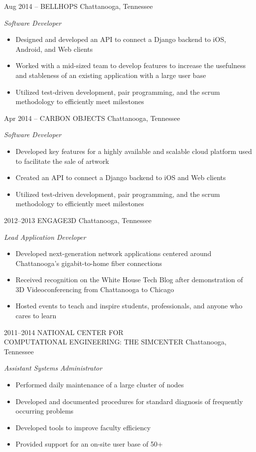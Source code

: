 \documentclass[]{friggeri-cv} %
\begin{document}
\begin{entrylist}
\entry
{Aug 2014 --}
{BELLHOPS}
{Chattanooga, Tennessee}
{\emph{Software Developer} \\ 
\begin{itemize}
\item Designed and developed an API to connect a Django backend to iOS, Android, and Web clients
\item Worked with a mid-sized team to develop features to increase the usefulness and stableness of an existing application with a large user base
\item Utilized test-driven development, pair programming, and the scrum methodology to efficiently meet milestones
\end{itemize}}
\entry
{Apr 2014 --}
{CARBON OBJECTS}
{Chattanooga, Tennessee}
{\emph{Software Developer} \\ 
\begin{itemize}
\item Developed key features for a highly available and scalable cloud platform used to facilitate the sale of artwork
\item Created an API to connect a Django backend to iOS and Web clients
\item Utilized test-driven development, pair programming, and the scrum methodology to efficiently meet milestones
\end{itemize}}

\entry
{2012--2013}
{ENGAGE3D}
{Chattanooga, Tennessee}
{\emph{ Lead Application Developer}\\
\begin{itemize}
\item Developed next-generation network applications centered around Chattanooga's gigabit-to-home fiber connections
\item Received recognition on the White House Tech Blog after demonstration of 3D Videoconferencing from Chattanooga to Chicago
\item Hosted events to teach and inspire students, professionals, and anyone who cares to learn
\end{itemize}}
\entry
{2011--2014}
{NATIONAL CENTER FOR \\
COMPUTATIONAL ENGINEERING: THE SIMCENTER}
{Chattanooga, Tennessee}
{\emph{ Assistant Systems Administrator} \\ 
\begin{itemize}
\item Performed daily maintenance of a large cluster of nodes
\item Developed and documented procedures for standard diagnosis of frequently occurring problems
\item Developed tools to improve faculty efficiency
\item Provided support for an on-site user base of 50+
\end{itemize}}
\end{entrylist}
\end{document}
